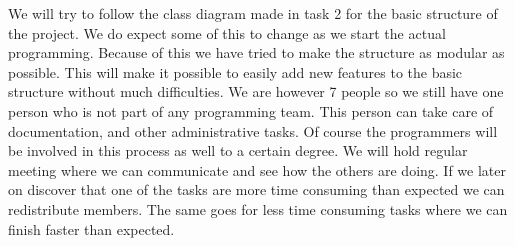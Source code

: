 \documentclass{article}
\begin{document}
    \noindent
    We will try to follow the class diagram made in task 2 for the basic structure of the project. We do expect some of this to change as we start the actual programming. Because of this we have tried to make the structure as modular as possible. This will make it possible to easily add new features to the basic structure without much difficulties. We are however 7 people so we still have one person who is not part of any programming team. This person can take care of documentation, and other administrative tasks. Of course the programmers will be involved in this process as well to a certain degree. We will hold regular meeting where we can communicate and see how the others are doing. If we later on discover that one of the tasks are more time consuming than expected we can redistribute members. The same goes for less time consuming tasks where we can finish faster than expected. \\
\end{document}
